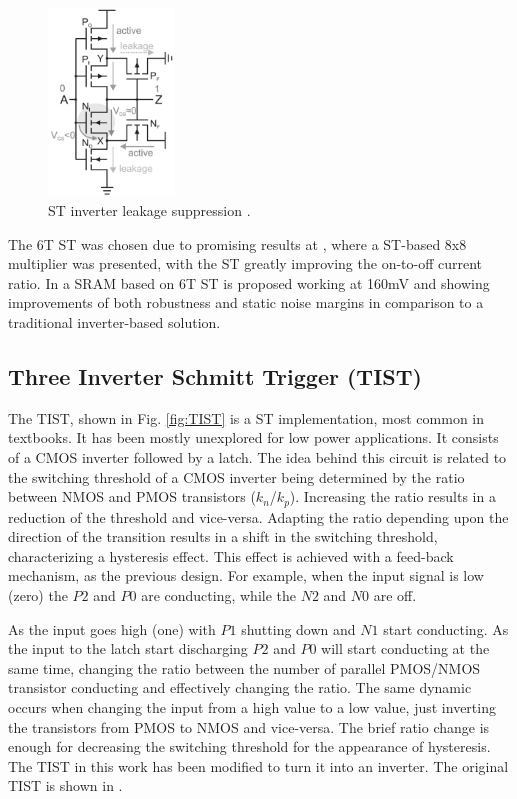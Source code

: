 \documentclass[pgmicro,diss,english]{iiufrgs}
\begin{document}
\begin{figure}[]
  \centering
    \includegraphics[width=0.3\textwidth]{ST.pdf}
     \caption{ST inverter leakage suppression \cite{lotze2017ultra}.}
  \label{fig:ST}
\end{figure}

The 6T ST was chosen due to promising results at \cite{lotze2017ultra}, where a ST-based 8x8 multiplier was presented, with the ST greatly improving the on-to-off current ratio. In \cite{kulkarni2007160} a SRAM based on 6T ST is proposed working at 160mV and showing improvements of both robustness and static noise margins in comparison to a traditional inverter-based solution.

\subsection{Three Inverter Schmitt Trigger (TIST)}

The TIST, shown in Fig. \ref{fig:TIST} is a ST implementation, most common in textbooks. It has been mostly unexplored for low power applications. It consists of a CMOS inverter followed by a latch. The idea behind this circuit is related to the switching threshold of a CMOS inverter being determined by the ratio between NMOS and PMOS transistors ($k_n$/$k_p$). Increasing the ratio results in a reduction of the threshold and vice-versa. Adapting the ratio depending upon the direction of the transition results in a shift in the switching threshold, characterizing a hysteresis effect. This effect is achieved with a feed-back mechanism, as the previous design. For example, when the input signal is low (zero) the $P2$ and $P0$ are conducting, while the $N2$ and $N0$ are off.

As the input goes high (one) with $P1$ shutting down and $N1$ start conducting. As the input to the latch start discharging $P2$ and $P0$ will start conducting at the same time, changing the ratio between the number of parallel PMOS/NMOS transistor conducting and effectively changing the ratio. The same dynamic occurs when changing the input from a high value to a low value, just inverting the transistors from PMOS to NMOS and vice-versa. The brief ratio change is enough for decreasing the switching threshold for the appearance of hysteresis. The TIST in this work has been modified to turn it into an inverter. The original TIST is shown in \cite{rabaey2002digital}.
\end{document}
